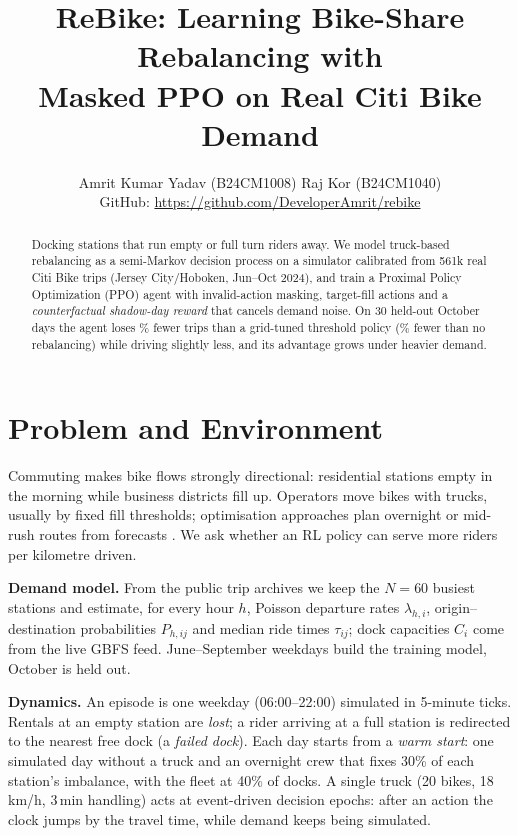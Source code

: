 \documentclass[10pt,twocolumn]{article}
\title{\vspace{-1.4cm}\textbf{ReBike: Learning Bike-Share Rebalancing with\\Masked PPO on Real Citi Bike Demand}\vspace{-0.3cm}}
\author{Amrit Kumar Yadav (B24CM1008) \quad Raj Kor (B24CM1040)\\
\small GitHub: \url{https://github.com/DeveloperAmrit/rebike}\vspace{-0.4cm}}
\date{}
\begin{document}
\maketitle

\begin{abstract}
\noindent Docking stations that run empty or full turn riders away. We model
truck-based rebalancing as a semi-Markov decision process on a simulator
calibrated from 561k real Citi Bike trips (Jersey City/Hoboken, Jun--Oct 2024),
and train a Proximal Policy Optimization (PPO) agent with invalid-action masking,
target-fill actions and a \emph{counterfactual shadow-day reward} that cancels
demand noise. On 30 held-out October days the agent loses \LostCutVsThr\% fewer trips
than a grid-tuned threshold policy (\LostCutVsNone\% fewer than no rebalancing)
while driving slightly less, and its advantage grows under heavier demand.
\end{abstract}

\section{Problem and Environment}
Commuting makes bike flows strongly directional: residential stations empty in
the morning while business districts fill up. Operators move bikes with trucks,
usually by fixed fill thresholds; optimisation approaches plan overnight or
mid-rush routes from forecasts \cite{omahony2015}. We ask whether an RL policy
can serve more riders per kilometre driven.

\textbf{Demand model.} From the public trip archives \cite{citibike} we keep the $N{=}60$ busiest
stations and estimate, for every hour $h$, Poisson departure rates
$\lambda_{h,i}$, origin--destination probabilities $P_{h,ij}$ and median ride
times $\tau_{ij}$; dock capacities $C_i$ come from the live GBFS feed.
June--September weekdays build the training model, October is held out.

\textbf{Dynamics.} An episode is one weekday (06:00--22:00) simulated in 5-minute
ticks. Rentals at an empty station are \emph{lost}; a rider arriving at a full
station is redirected to the nearest free dock (a \emph{failed dock}). Each day
starts from a \emph{warm start}: one simulated day without a truck and an
overnight crew that fixes 30\% of each station's imbalance, with the fleet at
40\% of docks. A single truck (20 bikes, 18\,km/h, 3\,min handling) acts at
event-driven decision epochs: after an action the clock jumps by the travel
time, while demand keeps being simulated.
\end{document}
